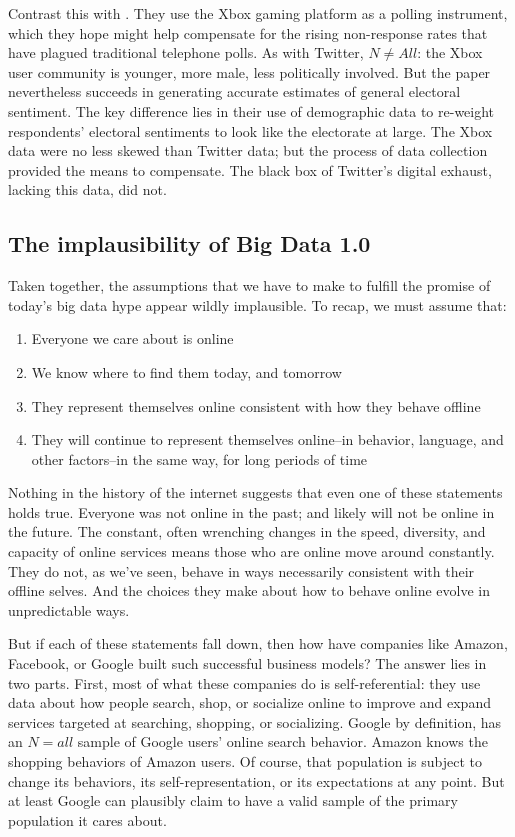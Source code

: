 \documentclass[12pt]{article}
\begin{document}
Contrast this with \cite{gelman2013}. They use the Xbox gaming platform as a polling
instrument, which they hope might help compensate for the rising
non-response rates that have plagued traditional telephone polls. As
with Twitter, $N \neq All$: the Xbox user community is younger, more
male, less politically involved. But the paper nevertheless
succeeds in generating accurate estimates of general electoral
sentiment. The key difference lies in their use of demographic data to
re-weight respondents' electoral sentiments to look like the
electorate at large. The Xbox data were no less skewed than Twitter
data; but the process of data collection provided the means to
compensate. The black box of Twitter's digital exhaust, lacking this
data, did not.



\subsection{The implausibility of Big Data 1.0}
\label{sec:impl-big-data}


Taken together, the assumptions that we have to make to fulfill the
promise of today's big data hype appear wildly implausible. To recap,
we must assume that:

\begin{enumerate}
\item Everyone we care about is online
\item We know where to find
  them today, and tomorrow
\item They represent themselves online
  consistent with how they behave offline
\item They will continue
  to represent themselves online--in behavior, language, and other
  factors--in the same way, for long periods of time
\end{enumerate}

Nothing in the history of the internet suggests that even one of
these statements holds true. Everyone was not online in the past; and
likely will not be online in the future. The constant, often
wrenching changes in the speed, diversity, and capacity of online
services means those who are online move around constantly. They do
not, as we've seen, behave in ways necessarily consistent with their
offline selves. And the choices they make about how to behave online
evolve in unpredictable ways. 

But if each of these statements fall down, then how have companies
like Amazon, Facebook, or Google built such successful business
models? The answer lies in two parts. First, most of what these
companies do is self-referential: they use data about how people
search, shop, or socialize online to improve and expand services
targeted at searching, shopping, or socializing. Google by definition,
has an $N=all$ sample of Google users' online search
behavior. Amazon knows the shopping behaviors of Amazon users. Of
course, that population is subject to change its behaviors, its
self-representation, or its expectations at any point. But at least
Google can plausibly claim to have a valid sample of the primary
population it cares about. 
\end{document}
